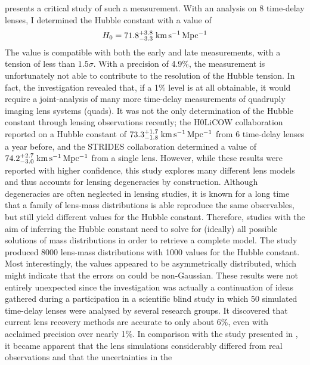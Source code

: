  presents a critical study of such a measurement.  With an
analysis on 8 time-delay lenses, I determined the Hubble constant with a value
of 
%
\begin{equation*}%
    \Ho = 71.8^{+3.8}_{-3.3}\;\Hunitsalt
\end{equation*}%
%
The value is compatible with both the early and late measurements, with a
tension of less than $1.5\sigma$.  With a precision of 4.9\%, the measurement is
unfortunately not able to contribute to the resolution of the Hubble tension.
In fact, the investigation revealed that, if a 1\% level is at all obtainable,
it would require a joint-analysis of many more time-delay measurements of
quadruply imaging lens systems (quads).  It was not the only determination of
the Hubble constant through lensing observations recently; the H0LiCOW
collaboration  reported on a Hubble constant of
$73.3^{+1.7}_{-1.8}\;\mathrm{km\,s^{-1}\,Mpc^{-1}}$ from 6 time-delay lenses a year before, and the
STRIDES collaboration  determined a value of
$74.2^{+2.7}_{-3.0}\;\mathrm{km\,s^{-1}\,Mpc^{-1}}$ from a single lens.  However, while these
results were reported with higher confidence, this study explores many different
lens models and thus accounts for lensing degeneracies by construction.
Although degeneracies are often neglected in lensing studies, it is known for a
long time that a family of lens-mass distributions is able reproduce the same
observables, but still yield different values for the Hubble constant.
Therefore, studies with the aim of inferring the Hubble constant need to solve
for (ideally) all possible solutions of mass distributions in order to retrieve
a complete model.  The study produced 8000 lens-mass distributions with 1000
values for the Hubble constant.  Most interestingly, the values appeared to be
asymmetrically distributed, which might indicate that the errors on \Ho{} could
be non-Gaussian.  These results were not entirely unexpected since the
investigation was actually a continuation of ideas gathered during a
participation in a scientific blind study  in which 50
simulated time-delay lenses were analysed by several research groups.  It
discovered that current lens recovery methods are accurate to only about 6\%,
even with acclaimed precision over nearly 1\%.  In comparison with the study
presented in , it became apparent that the lens simulations
considerably differed from real observations and that the uncertainties in the
